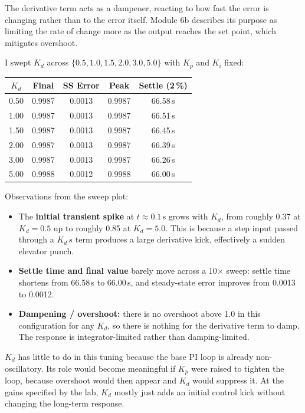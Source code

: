 \documentclass[11pt,letterpaper]{article}
\begin{document}
The derivative term acts as a dampener, reacting to how fast the error is
changing rather than to the error itself. Module 6b describes its purpose
as limiting the rate of change more as the output reaches the set point,
which mitigates overshoot.

I swept $K_{d}$ across $\{0.5, 1.0, 1.5, 2.0, 3.0, 5.0\}$ with $K_{p}$ and
$K_{i}$ fixed:

\begin{table}[h!]
\centering
\small
\begin{tabular}{@{}ccccc@{}}
\toprule
$K_{d}$ & Final & SS Error & Peak & Settle (2\,\%) \\
\midrule
0.50 & 0.9987 & 0.0013 & 0.9987 & 66.58\,s \\
1.00 & 0.9987 & 0.0013 & 0.9987 & 66.51\,s \\
1.50 & 0.9987 & 0.0013 & 0.9987 & 66.45\,s \\
2.00 & 0.9987 & 0.0013 & 0.9987 & 66.39\,s \\
3.00 & 0.9987 & 0.0013 & 0.9987 & 66.26\,s \\
5.00 & 0.9988 & 0.0012 & 0.9988 & 66.00\,s \\
\bottomrule
\end{tabular}
\end{table}

Observations from the sweep plot:

\begin{itemize}
  \item The \textbf{initial transient spike} at $t\approx0.1$\,s grows with
  $K_{d}$, from roughly 0.37 at $K_{d}=0.5$ up to roughly 0.85 at
  $K_{d}=5.0$. This is because a step input passed through a $K_{d}\,s$
  term produces a large derivative kick, effectively a sudden elevator
  punch.
  \item \textbf{Settle time and final value} barely move across a
  10$\times$ sweep: settle time shortens from 66.58\,s to 66.00\,s, and
  steady-state error improves from 0.0013 to 0.0012.
  \item \textbf{Dampening / overshoot:} there is no overshoot above 1.0 in
  this configuration for any $K_{d}$, so there is nothing for the
  derivative term to damp. The response is integrator-limited rather than
  damping-limited.
\end{itemize}

$K_{d}$ has little to do in this tuning because the base PI loop is
already non-oscillatory. Its role would become meaningful if $K_{p}$ were
raised to tighten the loop, because overshoot would then appear and
$K_{d}$ would suppress it. At the gains specified by the lab, $K_{d}$
mostly just adds an initial control kick without changing the long-term
response.
\end{document}
